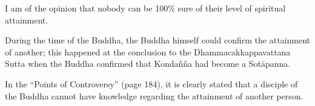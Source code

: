 
I am of the opinion that nobody can be 100\% sure of their level of spiritual attainment. 

During the time of the Buddha, the Buddha himself could confirm the attainment of another; this happened at the conclusion to the Dhammacakkappavattana Sutta when the Buddha confirmed that Kondañña had become a Sotāpanna.

In the “Points of Controversy” (page 184), it is clearly stated that a disciple of the Buddha cannot have knowledge regarding the attainment of another person.
